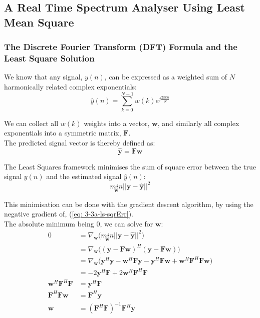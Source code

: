 \documentclass[12pt]{article}
\numberwithin{equation}{section}
\def\vy{{\bm{y}}}
\def\vw{{\bm{w}}}
\def\mF{{\bm{F}}}
\begin{document}
	\subsection{A Real Time Spectrum Analyser Using Least Mean Square} \label{sec: 3-3-real-time-spectrum-LMS}
		\subsubsection{The Discrete Fourier Transform (DFT) Formula and the Least Square Solution}
			We know that any signal, $y(n)$, can be expressed as a weighted sum of $N$ harmonically related complex exponentials:
			\begin{equation}
			\hat{y}(n) = \sum_{k=0}^{N-1}w(k)e^{j\frac{2\pi kn}{N}}
			\end{equation}
			
			\noindent
			We can collect all $w(k)$ weights into a vector, $\vw$, and similarly all complex exponentials into a symmetric matrix, $\mF$. \\
			The predicted signal vector is thereby defined as:
			\begin{equation}
			\hat{\vy} = \mF\vw
			\label{eq: 3-3a-y_hat}
			\end{equation}
			
			\noindent
			The Least Squares framework minimises the sum of square error between the true signal $y(n)$ and the estimated signal $\hat{y}(n)$:
			\begin{equation}
			\underset{\vw}{min} ||\vy-\hat{\vy}||^2
			\label{eq: 3-3a-ls-sqrErr}
			\end{equation}
			
			\noindent
			This minimisation can be done with the gradient descent algorithm, by using the negative gradient of, (\ref{eq: 3-3a-ls-sqrErr}).\\
			The absolute minimum being $0$, we can solve for $\vw$:
			\begin{align}
			0 					&= \nabla_{\vw} \bigg( \underset{\vw}{min} ||\vy-\hat{\vy}||^2 \bigg) \\
			 					&= \nabla_{\vw} \bigg( (\vy-\mF\vw)^{H} (\vy-\mF\vw) \bigg) \\
								&= \nabla_{\vw} \bigg( \vy^{H}\vy-\vw^H\mF\vy -\vy^{H}\mF\vw+\vw^{H}\mF^{H}\mF\vw \bigg)\\
								&= -2\vy^{H}\mF + 2\vw^{H}\mF^{H}\mF\\
			\vw^{H}\mF^{H}\mF	&= \vy^{H}\mF \\
			\mF^{H}\mF\vw		&= \mF^{H}\vy \\
			\vw					&= (\mF^{H}\mF)^{-1}\mF^{H}\vy \label{eq: 3-3a-weight:proof}
			\end{align}
			
\end{document}
